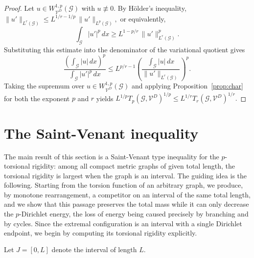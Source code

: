 \documentclass[12pt,a4paper]{article}
\numberwithin{equation}{section}
\newcommand{\WpD}{W^{1,p}_{\mathcal{V}^D}(\mathcal G)}
\begin{document}
\begin{proof}
	Let $u\in\WpD$ with $u\not\equiv0$. By H\"older's inequality,
	\(
	\|u'\|_{L^r(\mathcal G)}
	\le
	L^{1/r-1/p}\,
	\|u'\|_{L^p(\mathcal G)},
	\)
	or equivalently,
	\[
	\int_{\mathcal G}|u'|^p\,dx
	\ge
	L^{1-p/r}\,
	\|u'\|_{L^r(\mathcal G)}^p.
	\]
	Substituting this estimate into the denominator of the variational quotient
	gives
	\[
	\frac{\left(\int_{\mathcal G}|u|\,dx\right)^p}
	{\int_{\mathcal G}|u'|^p\,dx}
	\le
	L^{p/r-1}
	\left(
	\frac{\int_{\mathcal G}|u|\,dx}
	{\|u'\|_{L^r(\mathcal G)}}
	\right)^p.
	\]
	Taking the supremum over $u\in\WpD$ and applying
	Proposition~\ref{prop:char} for both the exponent $p$ and
 $r$  yields
	\(
L^{1/p}	T_p(\mathcal G,\mathcal{V}^D)^{1/p}
	\le
	L^{1/r}
	T_r(\mathcal G,\mathcal{V}^D)^{1/r}.
	\)
\end{proof}
\section{The Saint-Venant inequality}
\label{sec:saintvenant}

The main result of this section is a Saint-Venant type inequality for
the $p$-torsional rigidity: among all compact metric graphs of given
total length, the torsional rigidity is largest when the graph is an interval. The guiding idea is the following. Starting from the
torsion function of an arbitrary graph, we produce, by monotone
rearrangement, a competitor on an interval of the same total length,
and we show that this passage preserves the total mass while it can
only decrease the $p$-Dirichlet energy, the loss of energy being
caused precisely by branching and by cycles. Since the extremal
configuration is an interval with a single Dirichlet endpoint, we begin
by computing its torsional rigidity explicitly.


Let $J=[0,L]$ denote the interval of length $L$.
\end{document}
